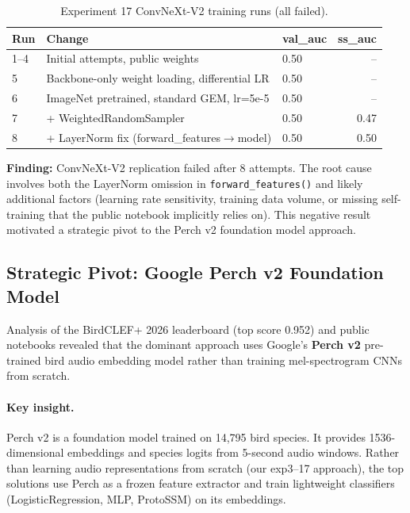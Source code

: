 \begin{table}[h]
\centering
\caption{Experiment 17 ConvNeXt-V2 training runs (all failed).}
\begin{tabular}{lllr}
\toprule
Run & Change & val\_auc & ss\_auc \\
\midrule
1--4 & Initial attempts, public weights & 0.50 & -- \\
5 & Backbone-only weight loading, differential LR & 0.50 & -- \\
6 & ImageNet pretrained, standard GEM, lr=5e-5 & 0.50 & -- \\
7 & + WeightedRandomSampler & 0.50 & 0.47 \\
8 & + LayerNorm fix (forward\_features$\rightarrow$model) & 0.50 & 0.50 \\
\bottomrule
\end{tabular}
\end{table}

\textbf{Finding:} ConvNeXt-V2 replication failed after 8 attempts. The root cause
involves both the LayerNorm omission in \texttt{forward\_features()} and likely
additional factors (learning rate sensitivity, training data volume, or missing
self-training that the public notebook implicitly relies on). This negative result
motivated a strategic pivot to the Perch v2 foundation model approach.

\subsection{Strategic Pivot: Google Perch v2 Foundation Model}
\label{sec:perch_pivot}

Analysis of the BirdCLEF+ 2026 leaderboard (top score 0.952) and public notebooks
revealed that the dominant approach uses Google's \textbf{Perch v2} pre-trained bird
audio embedding model rather than training mel-spectrogram CNNs from scratch.

\paragraph{Key insight.}
Perch v2 is a foundation model trained on 14,795 bird species. It provides
1536-dimensional embeddings and species logits from 5-second audio windows.
Rather than learning audio representations from scratch (our exp3--17 approach),
the top solutions use Perch as a frozen feature extractor and train lightweight
classifiers (LogisticRegression, MLP, ProtoSSM) on its embeddings.

